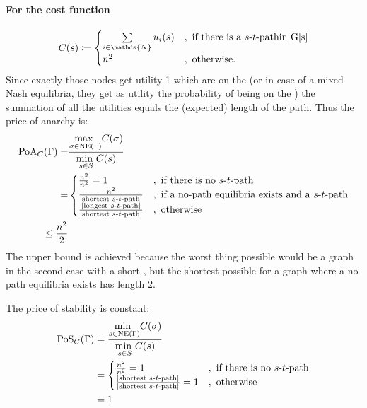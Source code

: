 \documentclass{article}
\begin{document}
\paragraph{For the cost function}
\[
    C(s) \coloneqq
    \begin{cases}
        \sum\limits_{i\in \mathds{N}}u_i(s) &, \text{ if there is a \stpath in G[s]}\\
        n^2                            &, \text{ otherwise}.
    \end{cases}
\]
Since exactly those nodes get utility 1 which are on the \stpath (or in case of a mixed Nash equilibria, they get as utility the probability of being on the \stpath) the summation of all the utilities equals the (expected) length of the path.
Thus the price of anarchy is:
\begin{align*}
    \textup{PoA}_C(\Gamma) =& \frac{\underset{\sigma\in \textup{NE}(\Gamma)}{\max\ } C(\sigma)}{\underset{s\in S}{\min\ } C(s)}\\
    =& \begin{cases}
        \frac{n^2}{n^2} = 1 &, \text{ if there is no $s$-$t$-path{}}\\
        \frac{n^2}{|\text{shortest $s$-$t$-path}|} &, \text{ if a no-path equilibria exists and a $s$-$t$-path{}}\\
        \frac{|\text{longest $s$-$t$-path}|}{|\text{shortest $s$-$t$-path}|} &, \text{ otherwise}
    \end{cases}\\
    \leq \frac{n^2}{2}
\end{align*}
The upper bound is achieved because the worst thing possible would be a graph in the second case with a short \stpath{}, but the shortest possible \stpath{} for a graph where a no-path equilibria exists has length 2.

The price of stability is constant:
\begin{align*}
    \textup{PoS}_C(\Gamma) &= \frac{\underset{s\in \textup{NE} (\Gamma)}{\min\ }C(\sigma)}{\underset{s\in S}{\min\ }C(s)}\\
    &= \begin{cases}
        \frac{n^2}{n^2} = 1 &, \text{ if there is no $s$-$t$-path{}}\\
        \frac{|\text{shortest $s$-$t$-path}|}{|\text{shortest $s$-$t$-path}|} = 1 &, \text{ otherwise}\\
    \end{cases}\\
    &= 1
\end{align*}
\end{document}
